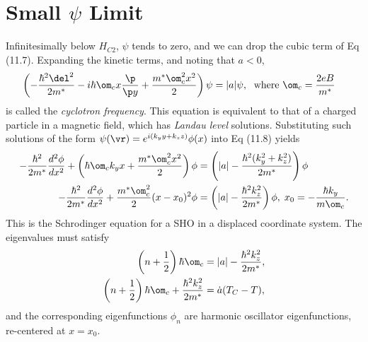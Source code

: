 \documentclass[a4paper, 11pt, normalem]{report}
\begin{document}
\section{Small \texorpdfstring{$\psi$}{psi} Limit}
Infinitesimally below $H_{C2}$, $\psi$ tends to zero, and we can drop the cubic term of Eq (11.7).
Expanding the kinetic terms, and noting that $a<0$,
\begin{align}
    \left(-\frac{\hbar^2\del^2}{2m^*} - i\hbar\om_cx\frac{\p}{\p y} + \frac{m^*\om_c^2x^2}{2}\right)\psi &= |a|\psi,\; \text{ where } \om_c = \frac{2eB}{m^*}
\end{align}
is called the \emph{cyclotron frequency}.
This equation is equivalent to that of a charged particle in a magnetic field, which has \emph{Landau level} solutions.
Substituting such solutions of the form $\psi(\vr)=e^{i(k_yy+k_zz)}\phi(x)$ into Eq (11.8) yields
\begin{align}
    -\frac{\hbar^2}{2m^*}\frac{d^2\phi}{dx^2} + \left(\hbar\om_ck_yx+\frac{m^*\om_c^2x^2}{2}\right)\phi &= \left(|a| - \frac{\hbar^2(k_y^2+k_z^2)}{2m^*}\right)\phi \\
    -\frac{\hbar^2}{2m^*}\frac{d^2\phi}{dx^2}+\frac{m^*\om_c^2}{2}(x-x_0)^2\phi &= \left(|a|-\frac{\hbar^2k_z^2}{2m^*}\right)\phi,\; x_0 = -\frac{\hbar k_y}{m\om_c}.
\end{align}
This is the Schrodinger equation for a SHO in a displaced coordinate system.
The eigenvalues must satisfy
\begin{align}
    \left(n+\frac12\right)\hbar\om_c &= |a|-\frac{\hbar^2k_z^2}{2m^*},\\
    \left(n+\frac12\right)\hbar\om_c + \frac{\hbar^2k_z^2}{2m^*} &= \dot{a}(T_C-T),
\end{align}
and the corresponding eigenfunctions $\phi_n$ are harmonic oscillator eigenfunctions, re-centered at $x=x_0$.
\end{document}
